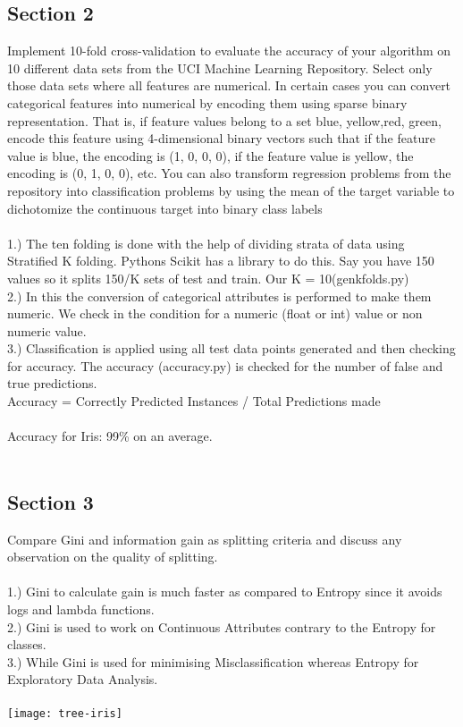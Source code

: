 \documentclass[12pt,a4paper,titlepage]{article}
\begin{document}
{{{\subsection{Section 2}{
Implement 10-fold cross-validation to evaluate the accuracy of your algorithm on 10 different data sets from the UCI Machine Learning Repository. Select only those data sets where all features are numerical. In certain cases you can convert categorical features into numerical by encoding them using sparse binary representation. That is, if feature values belong to a set {blue, yellow,red, green}, encode this feature using 4-dimensional binary vectors such that if the feature value is blue, the encoding is (1, 0, 0, 0), if the feature value is yellow, the encoding is (0, 1, 0, 0), etc. You can also transform regression problems from the repository into classification problems by using the mean of the target variable to dichotomize the continuous target into binary class labels\\~\\
1.) The ten folding is done with the help of dividing strata of data using Stratified K folding. Pythons Scikit has a library to do this. Say you have 150 values so it splits 150/K sets of test and train. Our K = 10(genkfolds.py)\\
2.) In this the conversion of categorical attributes is performed to make them numeric. We check in the condition for a numeric (float or int) value or non numeric value.\\
3.) Classification is applied using all test data points generated and then checking for accuracy. The accuracy (accuracy.py) is checked for the number of false and true predictions.\\ Accuracy = Correctly Predicted Instances / Total Predictions made\\~\\

Accuracy for Iris: 99\% on an average.\\~\\
}
\subsection{Section 3}{
Compare Gini and information gain as splitting criteria and discuss any observation on the
quality of splitting.\\~\\
1.) Gini to calculate gain is much faster as compared to Entropy since it avoids logs and lambda functions.\\
2.) Gini is used to work on Continuous Attributes contrary to the Entropy for classes.\\
3.) While Gini is used for minimising Misclassification whereas Entropy for Exploratory Data Analysis.\\~\\
\centering
\texttt{[image: tree-iris]}\\
}

}}}
\end{document}
